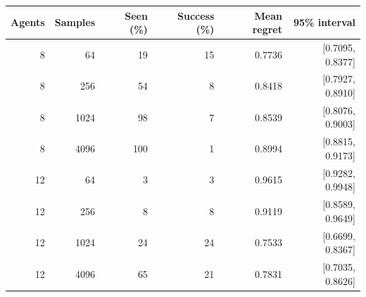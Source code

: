 \begin{tabular}{rrrrrr}
\toprule
Agents & Samples & Seen (\%) & Success (\%) & Mean regret & 95\% interval \\
\midrule
8 & 64 & 19 & 15 & 0.7736 & [0.7095, 0.8377] \\
8 & 256 & 54 & 8 & 0.8418 & [0.7927, 0.8910] \\
8 & 1024 & 98 & 7 & 0.8539 & [0.8076, 0.9003] \\
8 & 4096 & 100 & 1 & 0.8994 & [0.8815, 0.9173] \\
12 & 64 & 3 & 3 & 0.9615 & [0.9282, 0.9948] \\
12 & 256 & 8 & 8 & 0.9119 & [0.8589, 0.9649] \\
12 & 1024 & 24 & 24 & 0.7533 & [0.6699, 0.8367] \\
12 & 4096 & 65 & 21 & 0.7831 & [0.7035, 0.8626] \\
\bottomrule
\end{tabular}
